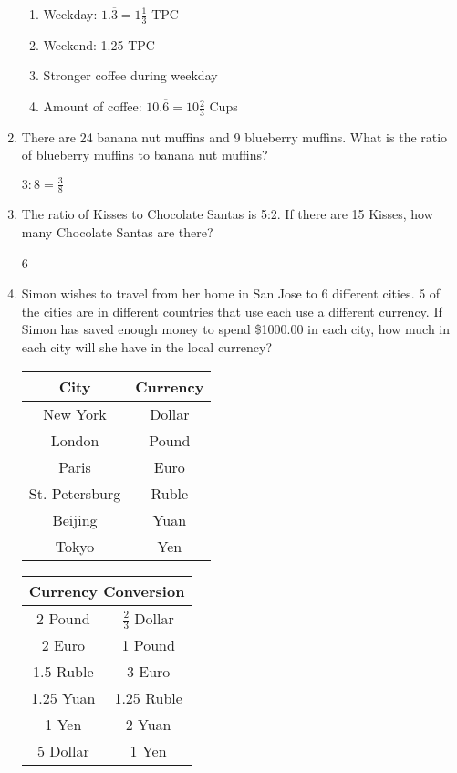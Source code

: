 \documentclass[12pt]{article}
\begin{document}
\begin{enumerate}
	\begin{enumerate}
		\item Weekday: \( 1.\overline{3} = 1\frac{1}{3} \) TPC
		\item Weekend: 1.25 TPC
		\item Stronger coffee during weekday
		\item Amount of coffee: \( 10.\overline{6} = 10\frac{2}{3} \) Cups
	\end{enumerate}

\item There are 24 banana nut muffins and 9 blueberry muffins.  What is the ratio of blueberry muffins to banana nut muffins?

	\( 3:8 = \frac{3}{8} \)

\item The ratio of Kisses to Chocolate Santas is 5:2.  If there are 15 Kisses, how many Chocolate Santas are there?

	6

\item Simon wishes to travel from her home in San Jose to 6 different cities.  5 of the cities are in different countries that use each use a different currency.  If Simon has saved enough money to spend \$1000.00 in each city, how much in each city will she have in the local currency?

	\begin{tabular}{ | c | c | }
	\hline
	\bf{City} & \bf{Currency} \\ \hline \hline
	New York & Dollar \\ \hline
	London & Pound \\ \hline
	Paris & Euro \\ \hline
	St. Petersburg & Ruble \\ \hline
	Beijing & Yuan \\ \hline
	Tokyo & Yen \\ \hline
	\hline
	\end{tabular}

	\begin{tabular}{ | c | c | }
	\hline
	\multicolumn{2}{|c|}{\bf{Currency Conversion}} \\ \hline \hline
	2 Pound & \( \frac{2}{3} \) Dollar \\ \hline
	2 Euro & 1 Pound \\ \hline
	1.5 Ruble & 3 Euro \\ \hline
	1.25 Yuan & 1.25 Ruble \\ \hline
	1 Yen & 2 Yuan \\ \hline
	5 Dollar & 1 Yen \\ \hline
	\hline
	\end{tabular}


\end{enumerate}
\end{document}
